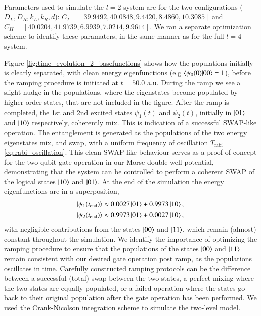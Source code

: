 \documentclass{subfiles}
\begin{document}
\\ 
Parameters used to simulate the $l=2$ system are for the two configurations ($D_L, D_R, k_L, k_R, d$): $C_I = [39.9492, 40.0848, 9.4420, 8.4860, 10.3085]$ and $C_{II} = [40.0204, 41.9739, 6.9939, 7.0214, 9.9614]$. We ran a separate optimization scheme to identify these paramaters, in the same manner as for the full $l=4$ system.

Figure \ref{fig:time_evolution_2_basefunctions} shows how the populations initially is clearly separated, with clean energy eigenfunctions (e.g $\braket{\psi_0(0)|00} = 1$), before the ramping procedure is initiated at $t = 50.0$ a.u. During the ramp we see a slight nudge in the populations, where the eigenstates become populated by higher order states, that are not included in the figure. After the ramp is completed, the 1st and 2nd excited states $\psi_1(t)$ and $\psi_2(t)$, initially in $\ket{01}$ and $\ket{10}$ respectively, coherently mix. This is indication of a successful SWAP-like operation. The entanglement is generated as the populations of the two energy eigenstates mix, and swap, with a uniform frequency of oscillation $T_{\text{rabi}}$ \eqref{eq:rabi_oscillation}. This clean SWAP-like behaviour serves as a proof of concept for the two-qubit gate operation in our Morse double-well potential, demonstrating that the system can be controlled to perform a coherent SWAP of the logical states $\ket{10}$ and $\ket{01}$. At the end of the simulation the energy eigenfunctions are in a superposition, 
\begin{align*}
    \ket{\psi_1(t_{\text{end}})} &\approx 0.0027 \ket{01} + 0.9973 \ket{10}, \\
    \ket{\psi_2(t_{\text{end}})} &\approx 0.9973 \ket{01} + 0.0027 \ket{10},
\end{align*}
with negligible contributions from the states $\ket{00}$ and $\ket{11}$, which remain (almost) constant throughout the simulation. We identify the importance of optimizing the ramping procedure to ensure that the populations of the states $\ket{00}$ and $\ket{11}$ remain consistent with our desired gate operation post ramp, as the populations oscillates in time. Carefully constructed ramping protocols can be the difference between a successful (total) swap between the two states, a perfect mixing where the two states are equally populated, or a failed operation where the states go back to their original population after the gate operation has been performed. We used the Crank-Nicolson integration scheme to simulate the two-level model. \\
\end{document}
